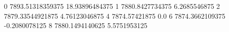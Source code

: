 0 7893.51318359375 18.93896484375
1 7880.8427734375 6.2685546875
2 7879.33544921875 4.76123046875
4 7874.57421875 0.0
6 7874.3662109375 -0.2080078125
8 7880.1494140625 5.5751953125
